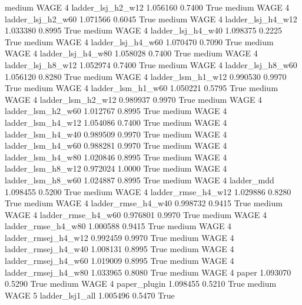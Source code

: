     medium     WAGE                 4   ladder_lsj_h2_w12   1.056160      0.7400    True
    medium     WAGE                 4   ladder_lsj_h2_w60   1.071566      0.6045    True
    medium     WAGE                 4   ladder_lsj_h4_w12   1.033380      0.8995    True
    medium     WAGE                 4   ladder_lsj_h4_w40   1.098375      0.2225    True
    medium     WAGE                 4   ladder_lsj_h4_w60   1.070470      0.7090    True
    medium     WAGE                 4   ladder_lsj_h4_w80   1.058028      0.7400    True
    medium     WAGE                 4   ladder_lsj_h8_w12   1.052974      0.7400    True
    medium     WAGE                 4   ladder_lsj_h8_w60   1.056120      0.8280    True
    medium     WAGE                 4   ladder_lsm_h1_w12   0.990530      0.9970    True
    medium     WAGE                 4   ladder_lsm_h1_w60   1.050221      0.5795    True
    medium     WAGE                 4   ladder_lsm_h2_w12   0.989937      0.9970    True
    medium     WAGE                 4   ladder_lsm_h2_w60   1.012767      0.8995    True
    medium     WAGE                 4   ladder_lsm_h4_w12   1.054086      0.7400    True
    medium     WAGE                 4   ladder_lsm_h4_w40   0.989509      0.9970    True
    medium     WAGE                 4   ladder_lsm_h4_w60   0.988281      0.9970    True
    medium     WAGE                 4   ladder_lsm_h4_w80   1.020846      0.8995    True
    medium     WAGE                 4   ladder_lsm_h8_w12   0.972024      1.0000    True
    medium     WAGE                 4   ladder_lsm_h8_w60   1.024887      0.8995    True
    medium     WAGE                 4          ladder_mdd   1.098455      0.5200    True
    medium     WAGE                 4  ladder_rmse_h4_w12   1.029886      0.8280    True
    medium     WAGE                 4  ladder_rmse_h4_w40   0.998732      0.9415    True
    medium     WAGE                 4  ladder_rmse_h4_w60   0.976801      0.9970    True
    medium     WAGE                 4  ladder_rmse_h4_w80   1.000588      0.9415    True
    medium     WAGE                 4 ladder_rmsej_h4_w12   0.992459      0.9970    True
    medium     WAGE                 4 ladder_rmsej_h4_w40   1.008131      0.8995    True
    medium     WAGE                 4 ladder_rmsej_h4_w60   1.019009      0.8995    True
    medium     WAGE                 4 ladder_rmsej_h4_w80   1.033965      0.8080    True
    medium     WAGE                 4               paper   1.093070      0.5290    True
    medium     WAGE                 4        paper_plugin   1.098455      0.5210    True
    medium     WAGE                 5     ladder_lsj1_all   1.005496      0.5470    True
